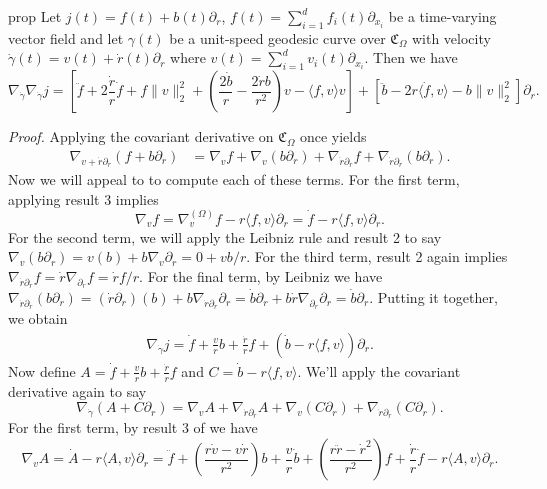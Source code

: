 \documentclass{article}
\begin{document}
\begin{restatable}{prop}{} \label{jacobi equation on cone p1}
    Let $j(t) = f(t) + b(t)\partial_r$, $f(t) = \sum_{i = 1}^df_i(t)\partial_{x_i}$ be a time-varying vector field and let $\gamma(t)$ be a unit-speed geodesic curve over $\mathfrak{C}_\Omega$ with velocity $\dot \gamma(t) = v(t) + \dot r(t)\partial_r$ where $v(t) = \sum_{i = 1}^dv_i(t)\partial_{x_i}$. Then we have 
    \[\nabla_{\dot \gamma} \nabla_{\dot \gamma}j = \left[\ddot f + 2\frac{\dot r}{r}\dot f + f\|v\|_2^2  + \left(\frac{2\dot b}{r} - \frac{2 \dot rb}{r^2}\right)v - \langle f,v\rangle v\right] + \left[\ddot b - 2r\langle \dot f, v\rangle - b\|v\|_2^2\right]\partial_r.\]
\end{restatable}
\noindent \textit{Proof.} Applying the covariant derivative on $\mathfrak{C}_\Omega$ once yields
\begin{align*}
    \nabla_{v + \dot r \partial_r}(f + b\partial_r) &= \nabla_vf + \nabla_v(b\partial_r) + \nabla_{\dot r\partial_r}f + \nabla_{\dot r\partial_r}(b\partial_r).
\end{align*}
Now we will appeal to  to compute each of these terms. For the first term, applying result 3 implies
\[\nabla_vf = \nabla_{v}^{(\Omega)}f - r\langle f, v\rangle \partial_r = \dot f - r\langle f, v\rangle \partial_r.\]
For the second term, we will apply the Leibniz rule and result 2 to say $\nabla_v(b\partial_r) = v(b) + b\nabla_v\partial_r = 0 + vb/r$. For the third term, result 2 again implies $\nabla_{\dot r\partial_r}f = \dot r\nabla_{\partial_r}f = \dot rf/r.$ For the final term, by Leibniz we have $\nabla_{\dot r\partial_r}(b\partial_r) = (\dot r\partial_r)(b) + b\nabla_{\dot r\partial_r}\partial_r = \dot b\partial_r + b\dot r\nabla_{\partial_r}\partial_r = \dot b \partial_r$.
Putting it together, we obtain
\begin{align*}
    \nabla_{\dot \gamma}j = \dot f + \frac{v}{r}b + \frac{\dot r}{r}f + \left(\dot b - r \langle f, v\rangle \right)\partial_r.
\end{align*}
Now define $A = \dot f + \frac{v}{r}b + \frac{\dot r}{r}f$ and $C = \dot b - r \langle f, v\rangle $. We'll apply the covariant derivative again to say
\[\nabla_{\dot \gamma} (A + C\partial_r)  = \nabla_vA + \nabla_{\dot r\partial_r}A + \nabla_v(C\partial_r) + \nabla_{\dot r\partial_r}(C\partial_r).\]
For the first term, by result 3 of  we have 
\[\nabla_vA = \dot A - r\langle A, v\rangle \partial_r = \ddot f + \left(\frac{r\dot v - v\dot r}{r^2}\right)b + \frac{v}{r}\dot b + \left(\frac{r\ddot r - \dot r^2}{r^2}\right)f + \frac{\dot r}{r}\dot f - r\langle A, v\rangle \partial_r.\]
\end{document}
